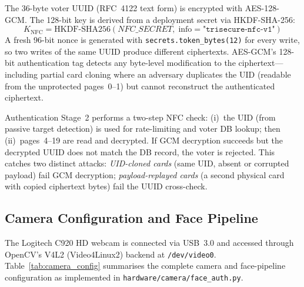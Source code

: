 \documentclass[conference]{IEEEtran}
\begin{document}
The 36-byte voter UUID (RFC~4122 text form) is encrypted with AES-128-GCM.
The 128-bit key is derived from a deployment secret via HKDF-SHA-256:
\begin{equation}
  K_{\mathrm{NFC}} = \mathrm{HKDF\text{-}SHA256}(\mathit{NFC\_SECRET},\;
    \text{info}{=}\texttt{"trisecure-nfc-v1"})
\end{equation}
A fresh 96-bit nonce is generated with \texttt{secrets.token\_bytes(12)}
for every write, so two writes of the same UUID produce different ciphertexts.
AES-GCM's 128-bit authentication tag detects any byte-level modification to
the ciphertext—including partial card cloning where an adversary duplicates
the UID (readable from the unprotected pages~0–1) but cannot reconstruct the
authenticated ciphertext.

Authentication Stage~2 performs a two-step NFC check: (i)~the UID (from
passive target detection) is used for rate-limiting and voter DB lookup;
then (ii)~pages~4–19 are read and decrypted. If GCM decryption succeeds but
the decrypted UUID does not match the DB record, the voter is rejected. This
catches two distinct attacks: \emph{UID-cloned cards} (same UID, absent or
corrupted payload) fail GCM decryption; \emph{payload-replayed cards} (a
second physical card with copied ciphertext bytes) fail the UUID cross-check.

\subsection{Camera Configuration and Face Pipeline}

The Logitech C920 HD webcam is connected via USB~3.0 and accessed through
OpenCV's V4L2 (Video4Linux2) backend at \texttt{/dev/video0}.
Table~\ref{tab:camera_config} summarises the complete camera and face-pipeline
configuration as implemented in \texttt{hardware/camera/face\_auth.py}.
\end{document}

